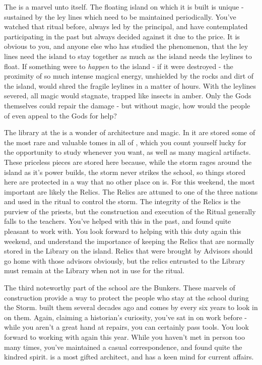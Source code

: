 \documentclass[char]{GL2020}
\begin{document}
The \pSc{} is a marvel unto itself. The floating island on which it is built is unique - sustained by the ley lines which need to be maintained periodically. You’ve watched that ritual before, always led by the principal, and have contemplated participating in the past but always decided against it due to the price. It is obvious to you, and anyone else who has studied the phenomenon, that the ley lines need the island to stay together as much as the island needs the leylines to float. If something were to \emph{happen} to the island - if it were destroyed - the proximity of so much intense magical energy, unshielded by the rocks and dirt of the island, would shred the fragile leylines in a matter of hours. With the leylines severed, all magic would stagnate, trapped like insects in amber. Only the Gods themselves could repair the damage - but without magic, how would the people of \pEarth{} even appeal to the Gods for help?

The library at the \pSc{} is a wonder of architecture and magic. In it are stored some of the most rare and valuable tomes in all of \pEarth{}, which you count yourself lucky for the opportunity to study whenever you want, as well as many magical artifacts. These priceless pieces are stored here because, while the storm rages around the island as it’s power builds, the storm never strikes the school, so things stored here are protected in a way that no other place on \pEarth{} is. For this weekend, the most important are likely the Relics. The Relics are attuned to one of the three nations and used in the ritual to control the storm. The integrity of the Relics is the purview of the priests, but the construction and execution of the Ritual generally falls to the teachers. You’ve helped \cLibrarian{} with this in the past, and found \cLibrarian{\them} quite pleasant to work with. You look forward to helping with this duty again this weekend, and understand the importance of keeping the Relics that are normally stored in the Library on the island. Relics that were brought by Advisors should go home with those advisors obviously, but the relics entrusted to the Library must remain at the Library when not in use for the ritual.

The third noteworthy part of the school are the Bunkers. These marvels of construction provide a way to protect the people who stay at the school during the Storm. \cBunker{} built them several decades ago and comes by every six years to look in on them. Again, claiming a historian’s curiosity, you’ve sat in on \cBunker{\their} work before - while you aren’t a great hand at repairs, you can certainly pass tools. You look forward to working with \cBunker{} again this year. While you haven’t met \cBunker{\them} in person too many times, you’ve maintained a casual correspondence, and found quite the kindred spirit. \cBunker{} is a most gifted architect, and has a keen mind for current affairs. 
\end{document}
